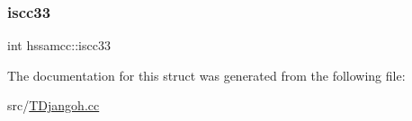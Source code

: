 \mbox{\label{structhssamcc_a6e7421eda9a06372741b8b6d1421ef27}} 
\subsubsection{\texorpdfstring{iscc33}{iscc33}}
{\footnotesize\ttfamily int hssamcc\+::iscc33}



The documentation for this struct was generated from the following file\+:\begin{DoxyCompactItemize}
\item 
src/\hyperlink{_t_djangoh_8cc}{T\+Djangoh.\+cc}\end{DoxyCompactItemize}
